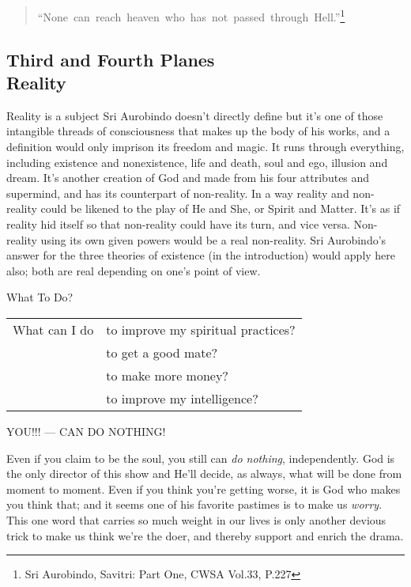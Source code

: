 \documentclass[12pt,a4paper]{book}
\begin{document}
\begin{verse}
``None~can~reach~heaven~who~has~not~passed~through~Hell.''\footnote{Sri Aurobindo, Savitri: Part One, CWSA Vol.33, P.227}
\end{verse}


\newpage
\begin{center}\section*{Third and Fourth Planes\\Reality}\end{center}

Reality is a subject Sri Aurobindo doesn't directly define but it's
one of those intangible threads of consciousness that makes up the
body of his works, and a definition would only imprison its freedom
and magic. It runs through everything, including existence and
nonexistence, life and death, soul and ego, illusion and dream. It's
another creation of God and made from his four attributes and
supermind, and has its counterpart of non-reality. In a way reality and
non-reality could be likened to the play of He and She, or Spirit and
Matter. It's as if reality hid itself so that non-reality could have
its turn, and vice versa. Non-reality using its own given powers would
be a real non-reality. Sri Aurobindo's answer for the three theories of
existence (in the introduction) would apply here also; both are real
depending on one's point of view.

\noindent What To Do?

\noindent \begin{tabular}{ll}
What can I do &to improve my spiritual practices?\\
\ 	      &to get a good mate?\\
\             &to make more money?\\
\             &to improve my intelligence?\\
\end{tabular}

\noindent YOU!!! --- CAN DO NOTHING!

\noindent Even if you claim to be the soul, you still can \emph{do
  nothing}, independently. God is the only director of this show and
He'll decide, as always, what will be done from moment to moment. Even
if you think you're getting worse, it is God who makes you think that;
and it seems one of his favorite pastimes is to make us \emph{worry}. This
one word that carries so much weight in our lives is only another
devious trick to make us think we're the doer, and thereby support and
enrich the drama.
\end{document}
